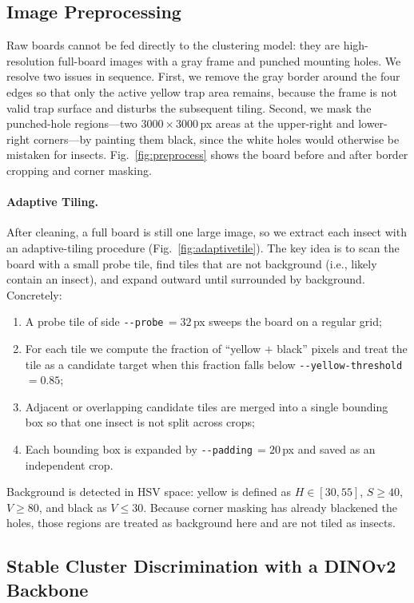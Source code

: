 \documentclass[10pt,a4paper,twocolumn]{article}
\begin{document}
\subsection{Image Preprocessing}
Raw boards cannot be fed directly to the clustering model: they are high-resolution full-board images with a gray frame and punched mounting holes. We resolve two issues in sequence. First, we remove the gray border around the four edges so that only the active yellow trap area remains, because the frame is not valid trap surface and disturbs the subsequent tiling. Second, we mask the punched-hole regions---two $3000\!\times\!3000$\,px areas at the upper-right and lower-right corners---by painting them black, since the white holes would otherwise be mistaken for insects. Fig.~\ref{fig:preprocess} shows the board before and after border cropping and corner masking.

\paragraph{Adaptive Tiling.}
After cleaning, a full board is still one large image, so we extract each insect with an adaptive-tiling procedure (Fig.~\ref{fig:adaptivetile}). The key idea is to scan the board with a small probe tile, find tiles that are not background (i.e., likely contain an insect), and expand outward until surrounded by background. Concretely:
\begin{enumerate}[leftmargin=1.4em,itemsep=2pt,topsep=2pt]
\item A probe tile of side \texttt{-{}-probe}\,$=32$\,px sweeps the board on a regular grid;
\item For each tile we compute the fraction of ``yellow $+$ black'' pixels and treat the tile as a candidate target when this fraction falls below \texttt{-{}-yellow-threshold}\,$=0.85$;
\item Adjacent or overlapping candidate tiles are merged into a single bounding box so that one insect is not split across crops;
\item Each bounding box is expanded by \texttt{-{}-padding}\,$=20$\,px and saved as an independent crop.
\end{enumerate}
Background is detected in HSV space: yellow is defined as $H\!\in\![30, 55]$, $S\!\geq\!40$, $V\!\geq\!80$, and black as $V\!\leq\!30$. Because corner masking has already blackened the holes, those regions are treated as background here and are not tiled as insects.

\subsection{Stable Cluster Discrimination with a DINOv2 Backbone}
\end{document}

